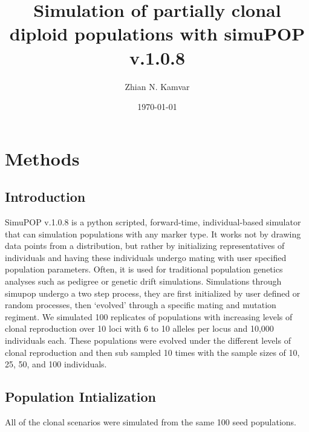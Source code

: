 \documentclass[letterpaper, draft, 10pt]{article}
\title{Simulation of partially clonal diploid populations with simuPOP v.1.0.8}
\author{Zhian N. Kamvar}
\date{\today}
\begin{document}
\maketitle
\linenumbers

\section{Methods}
\subsection*{Introduction}

SimuPOP v.1.0.8 is a python scripted, forward-time, individual-based simulator that can simulation populations with any marker type. 
It works not by drawing data points from a distribution, but rather by initializing representatives of individuals and having these individuals undergo mating with user specified population parameters.
Often, it is used for traditional population genetics analyses such as pedigree or genetic drift simulations.
Simulations through simupop undergo a two step process, they are first initialized by user defined or random processes, then `evolved' through a specific mating and mutation regiment.
We simulated 100 replicates of populations with increasing levels of clonal reproduction over 10 loci with 6 to 10 alleles per locus and 10,000 individuals each. 
These populations were evolved under the different levels of clonal reproduction and then sub sampled 10 times with the sample sizes of 10, 25, 50, and 100 individuals. 

\subsection*{Population Intialization}
All of the clonal scenarios were simulated from the same 100 seed populations.
\end{document}
